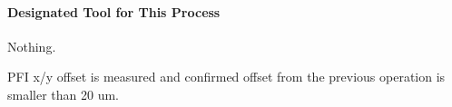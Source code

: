 \paragraph{Designated Tool for This Process}
Nothing.

\begin{itembox}[l]{}
PFI x/y offset is measured and confirmed offset from the previous operation is smaller than 20 um. 

\end{itembox}